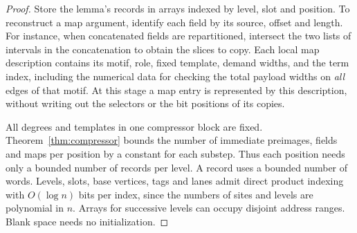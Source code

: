 \begin{proof}
Store the lemma's records in arrays indexed by level, slot and position.
To reconstruct a map argument, identify each field by its source, offset
and length. For instance, when
concatenated fields are repartitioned, intersect the two lists of
intervals in the concatenation to obtain the slices to copy. Each local
map description contains its motif, role, fixed template, demand widths,
and the term index, including the numerical data for checking the total
payload widths on \emph{all} edges of that motif. At this stage a map
entry is represented by this description, without writing out the
selectors or the bit positions of its copies.

All degrees and templates in one compressor block are fixed. Theorem~\ref{thm:compressor}
bounds the number of immediate preimages, fields and maps per position
by a constant for each substep. Thus each position needs only a bounded
number of records per level. A record uses a bounded number of words.
Levels, slots, base vertices, tags and lanes admit direct product indexing
with $O(\log n)$ bits per index, since the numbers of sites and levels
are polynomial in $n$. Arrays for successive levels can occupy disjoint
address ranges. Blank space needs no initialization. 


\end{proof}
